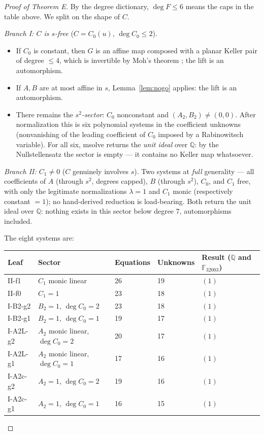 \documentclass[11pt]{amsart}
\newcommand{\QQ}{\mathbb{Q}}
\theoremstyle{plain}
\theoremstyle{definition}
\theoremstyle{remark}
\begin{document}
\begin{proof}[Proof of Theorem E]
By the degree dictionary, $\deg F\le6$ means the caps in the table above.
We split on the shape of $C$.

\emph{Branch I: $C$ is $s$-free} ($C=C_{0}(u)$, $\deg C_{0}\le2$).
\begin{itemize}
\item If $C_{0}$ is constant, then $G$ is an affine map composed with a
planar Keller pair of degree $\le4$, which is invertible by Moh's theorem
\cite{Moh83}; the lift is an automorphism.
\item If $A,B$ are at most affine in $s$, Lemma~\ref{lem:nogo} applies:
the lift is an automorphism.
\item There remains the \emph{$s^{2}$-sector}: $C_{0}$ nonconstant and
$(A_{2},B_{2})\neq(0,0)$. After normalization this is six polynomial
systems in the coefficient unknowns (nonvanishing of the leading
coefficient of $C_{0}$ imposed by a Rabinowitsch variable). For all six,
msolve returns the \emph{unit ideal} over $\QQ$: by the Nullstellensatz
the sector is empty --- it contains no Keller map whatsoever.
\end{itemize}

\emph{Branch II: $C_{1}\neq0$} ($C$ genuinely involves $s$). Two systems
at \emph{full} generality --- all coefficients of $A$ (through $s^{2}$,
degrees capped), $B$ (through $s^{2}$), $C_{0}$, and $C_{1}$ free, with
only the legitimate normalizations $\lambda=1$ and $C_{1}$ monic
(respectively constant $=1$); no hand-derived reduction is load-bearing.
Both return the unit ideal over $\QQ$: nothing exists in this sector
below degree $7$, automorphisms included.

The eight systems are:
\begin{center}
\begin{tabular}{lllll}
\toprule
Leaf & Sector & Equations & Unknowns & Result ($\QQ$ and
$\mathbb{F}_{32003}$)\\
\midrule
II-f1 & $C_{1}$ monic linear & 26 & 19 & $(1)$\\
II-f0 & $C_{1}=1$ & 23 & 18 & $(1)$\\
I-B2-g2 & $B_{2}=1$, $\deg C_{0}=2$ & 23 & 18 & $(1)$\\
I-B2-g1 & $B_{2}=1$, $\deg C_{0}=1$ & 19 & 17 & $(1)$\\
I-A2L-g2 & $A_{2}$ monic linear, $\deg C_{0}=2$ & 20 & 17 & $(1)$\\
I-A2L-g1 & $A_{2}$ monic linear, $\deg C_{0}=1$ & 17 & 16 & $(1)$\\
I-A2c-g2 & $A_{2}=1$, $\deg C_{0}=2$ & 19 & 16 & $(1)$\\
I-A2c-g1 & $A_{2}=1$, $\deg C_{0}=1$ & 16 & 15 & $(1)$\\
\bottomrule
\end{tabular}
\end{center}


\end{proof}
\end{document}

